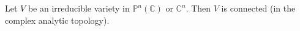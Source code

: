 Let $V$ be an irreducible variety in $\mathbb{P}^n(\mathbb{C})$ or $\mathbb{C}^n$. Then $V$ is connected (in the complex analytic topology).
